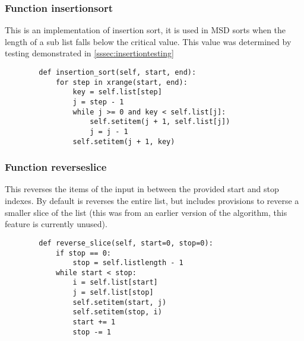\documentclass[12pt]{article}
\begin{document}
\subsubsection{Function insertion\textunderscore sort}
This is an implementation of insertion sort, it is used in MSD sorts when the length of a sub list falls below the critical value. This value was determined by testing demonstrated in \ref{sssec:insertiontesting}
\begin{lstlisting}
        def insertion_sort(self, start, end):
            for step in xrange(start, end):
                key = self.list[step]
                j = step - 1
                while j >= 0 and key < self.list[j]:
                    self.setitem(j + 1, self.list[j])
                    j = j - 1
                self.setitem(j + 1, key)
      \end{lstlisting}

\subsubsection{Function reverse\textunderscore slice}
This reverses the items of the input in between the provided start and stop indexes. By default is reverses the entire list, but includes provisions to reverse a smaller slice of the list (this was from an earlier version of the algorithm, this feature is currently unused).
\begin{lstlisting}
        def reverse_slice(self, start=0, stop=0):
            if stop == 0:
                stop = self.listlength - 1
            while start < stop:
                i = self.list[start]
                j = self.list[stop]
                self.setitem(start, j)
                self.setitem(stop, i)
                start += 1
                stop -= 1
      \end{lstlisting}
\pagebreak
\end{document}

